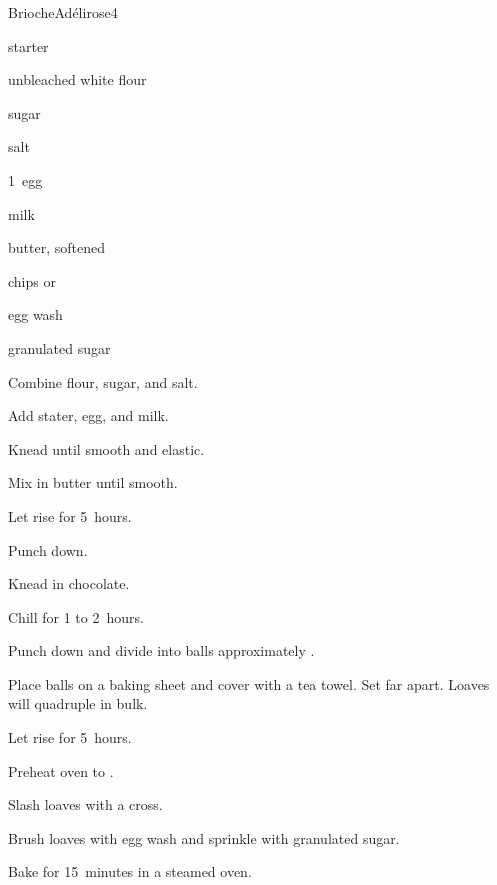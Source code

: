 \begin{recipe}{Brioche}{Adélirose}{4}

\begin{ingredients}
\item {} starter
\item {} unbleached white flour
\item {} sugar
\item {} salt
\item 1~egg
\item {} milk
\item {} butter, softened
\item {}  chips or 
\item egg wash
\item granulated sugar
\end{ingredients}

\begin{directions}
\item Combine flour, sugar, and salt.
\item Add stater, egg, and milk.
\item Knead until smooth and elastic.
\item Mix in butter until smooth.
\item Let rise for 5~hours.
\item Punch down.
\item Knead in chocolate.
\item Chill for 1 to 2~hours.
\item Punch down and divide into balls approximately .
\item Place balls on a baking sheet and cover with a tea towel. Set far apart. Loaves will quadruple in bulk.
\item Let rise for 5~hours.
\item Preheat oven to .
\item Slash loaves with a cross.
\item Brush loaves with egg wash and sprinkle with granulated sugar.
\item Bake for 15~minutes in a steamed oven.
\end{directions}

\end{recipe}
